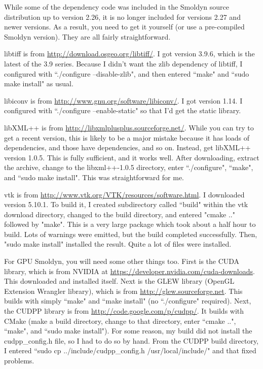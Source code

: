 \documentclass {book}
\begin{document}
While some of the dependency code was included in the Smoldyn source distribution up to version 2.26, it is no longer included for versions 2.27 and newer versions.  As a result, you need to get it yourself (or use a pre-compiled Smoldyn version).  They are all fairly straightforward.

libtiff is from \url{http://download.osgeo.org/libtiff/}.  I got version 3.9.6, which is the latest of the 3.9 series.  Because I didn't want the zlib dependency of libtiff, I configured with ``./configure --disable-zlib", and then entered ``make" and ``sudo make install" as usual.

libiconv is from \url{http://www.gnu.org/software/libiconv/}.  I got version 1.14.  I configured with ``./configure --enable-static" so that I'd get the static library.

libXML++ is from \url{http://libxmlplusplus.sourceforge.net/}.  While you can try to get a recent version, this is likely to be a major mistake because it has loads of dependencies, and those have dependencies, and so on.  Instead, get libXML++ version 1.0.5.  This is fully sufficient, and it works well.  After downloading, extract the archive, change to the libxml++-1.0.5 directory, enter ``./configure", ``make", and ``sudo make install".  This was straightforward for me.

vtk is from \url{http://www.vtk.org/VTK/resources/software.html}.  I downloaded version 5.10.1.  To build it, I created subdirectory called ``build" within the vtk download directory, changed to the build directory, and entered "cmake .." followed by "make".  This is a very large package which took about a half hour to build.  Lots of warnings were emitted, but the build completed successfully.  Then, "sudo make install" installed the result.  Quite a lot of files were installed.

For GPU Smoldyn, you will need some other things too.  First is the CUDA library, which is from NVIDIA at \url{https://developer.nvidia.com/cuda-downloads}.  This downloaded and installed itself.  Next is the GLEW library (OpenGL Extension Wrangler library), which is from \url{http://glew.sourceforge.net}.  This builds with simply ``make" and ``make install" (no ``./configure" required).  Next, the CUDPP library is from \url{http://code.google.com/p/cudpp/}.  It builds with CMake (make a build directory, change to that directory, enter ``cmake ..", ``make", and ``sudo make install").  For some reason, my build did not install the cudpp\_config.h file, so I had to do so by hand.  From the CUDPP build directory, I entered ``sudo cp ../include/cudpp\_config.h /usr/local/include/" and that fixed problems.
\end{document}
